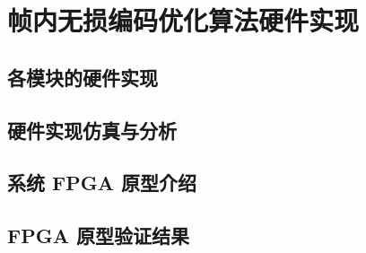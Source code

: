 \chapter{帧内无损编码优化算法硬件实现}
\label{cha:c4}

\section{各模块的硬件实现}

\section{硬件实现仿真与分析}

\section{系统 FPGA 原型介绍}

\section{FPGA 原型验证结果}